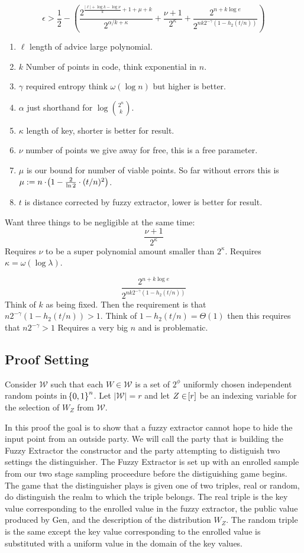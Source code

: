 \[
\epsilon> \frac{1}{2}-\left(\frac{2^{\frac{|\ell|+\log{k}-\log{\nu}}{k}+1+\mu+k}}{{2^{\alpha/k+\kappa}}}+\frac{\nu+1}{2^\kappa}+\frac{2^{n+k\log e}}{2^{nk2^{-\gamma}(1-h_2(t/n))}}\right)
\]

\begin{enumerate}
\item $\ell$ length of advice large polynomial.
\item $k$ Number of points in code, think exponential in $n$.
\item $\gamma$ required entropy think $\omega(\log n)$ but higher is better.
\item $\alpha$ just shorthand for $ \log {2^n\choose k}$.
\item $\kappa$ length of key, shorter is better for result.
\item $\nu$ number of points we give away for free, this is a free parameter.
\item $\mu$ is our bound for number of viable points.  So far without errors this is $\mu:= n \cdot \!\left(1 - \frac{2}{\ln{2}} \cdot (t/n)^{2}\right)$.
\item $t$ is distance corrected by fuzzy extractor, lower is better for result.
\end{enumerate}

Want three things to be negligible at the same time:
\[\frac{\nu+1}{2^\kappa} 
\]
Requires $\nu$ to be a super polynomial amount smaller than $2^\kappa$.  Requires $\kappa = \omega(\log \lambda)$.
 
 \[
\frac{2^{n+k\log e}}{2^{nk2^{-\gamma}(1-h_2(t/n))}}
 \]
 Think of $k$ as being fixed.  Then the requirement is that $n 2^{-\gamma}(1-h_2(t/n))>1$.  Think of $1-h_2(t/n) = \Theta(1)$ then this requires that $n2^{-\gamma} >1$  Requires a very big $n$ and is problematic. 
\subsection{Proof Setting}
Consider $\mathcal{W}$ such that each $W \in \mathcal{W}$ is a set of $2^{\phi}$ uniformly chosen independent random points in $\!\left\{ 0,1 \right\}^{n}$. 
Let $|\mathcal{W}| = r$ and let $Z \in \!\left[r\right]$ be an indexing variable for the selection of $W_Z$ from $\mathcal{W}$. 

In this proof the goal is to show that a fuzzy extractor cannot hope to hide the input point from an outside party. 
We will call the party that is building the Fuzzy Extractor the constructor and the party attempting to distiguish two settings the distinguisher. 
The Fuzzy Extractor is set up with an enrolled sample from our two stage sampling proceedure before the distiguishing game begins.
The game that the distinguisher plays is given one of two triples, real or random, do distinguish the realm to which the triple belongs. 
The real triple is the key value corresponding to the enrolled value in the fuzzy extractor, the public value produced by Gen, and the description of the distribution $W_Z$.
The random triple is the same except the key value corresponding to the enrolled value is substituted with a uniform value in the domain of the key values.

